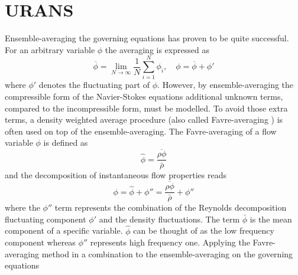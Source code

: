 
\section{URANS}
Ensemble-averaging the governing equations has proven to be quite successful. For an arbitrary variable $\phi$ the averaging is expressed as
\begin{equation}
  \overline{\phi} = \lim\limits_{N \to \infty}\frac{1}{N}\sum ^{N} _{i=1} \phi_i,  \quad \phi = \overline{\phi}+\phi'
\end{equation}
where $\phi'$ denotes the fluctuating part of $\phi$. However, by ensemble-averaging the compressible form of the Navier-Stokes equations additional unknown terms, compared to the incompressible form, must be modelled. To avoid those extra terms, a density weighted average procedure (also called Favre-averaging \cite{Favre1969}) is often used on top of the ensemble-averaging. The Favre-averaging of a flow variable ${\phi}$ is defined as 
\begin{equation}
  \hat{\phi} = \frac{\overline{\rho \phi}}{\bar{\rho}}
\end{equation}
and the decomposition of instantaneous flow properties reads
\begin{equation}
  \phi = \hat{\phi}+\phi'' = \frac{\overline{\rho \phi}}{\bar{\rho}}+\phi''
\end{equation}
where the $\phi''$ term represents the combination of the Reynolds decomposition fluctuating component $\phi'$ and the density fluctuations. The term $\bar{\phi}$ is the mean component of a specific variable. $\hat{\phi}$ can be thought of as the low frequency component whereas $\phi''$ represents high frequency one.
Applying the Favre-averaging method in a combination to the ensemble-averaging on the governing equations
